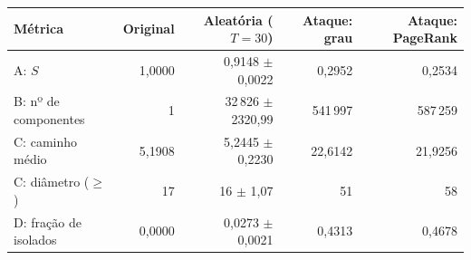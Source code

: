 \begin{tabular}{lrrrr}
    \toprule
    Métrica & Original & Aleatória ($T=30$) & Ataque: grau & Ataque: PageRank \\
    \midrule
    A: $S$ & 1,0000 & 0,9148 $\pm$ 0,0022 & 0,2952 & 0,2534 \\
    B: nº de componentes & 1 & 32\,826 $\pm$ 2320,99 & 541\,997 & 587\,259 \\
    C: caminho médio & 5,1908 & 5,2445 $\pm$ 0,2230 & 22,6142 & 21,9256 \\
    C: diâmetro ($\geq$) & 17 & 16 $\pm$ 1,07 & 51 & 58 \\
    D: fração de isolados & 0,0000 & 0,0273 $\pm$ 0,0021 & 0,4313 & 0,4678 \\
    \bottomrule
\end{tabular}
